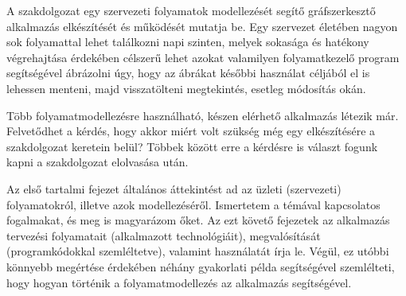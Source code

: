 
A szakdolgozat egy szervezeti folyamatok modellezését segítő gráfszerkesztő alkalmazás elkészítését és működését mutatja be. Egy szervezet életében nagyon sok folyamattal lehet találkozni napi szinten, melyek sokasága és hatékony végrehajtása érdekében célszerű lehet azokat valamilyen folyamatkezelő program segítségével ábrázolni úgy, hogy az ábrákat későbbi használat céljából el is lehessen menteni, majd visszatölteni megtekintés, esetleg módosítás okán.

Több folyamatmodellezésre használható, készen elérhető alkalmazás létezik már. Felvetődhet a kérdés, hogy akkor miért volt szükség még egy elkészítésére a szakdolgozat keretein belül? Többek között erre a kérdésre is választ fogunk kapni a szakdolgozat elolvasása után.

Az első tartalmi fejezet általános áttekintést ad az üzleti (szervezeti) folyamatokról, illetve azok modellezéséről. Ismertetem a témával kapcsolatos fogalmakat, és meg is magyarázom őket. Az ezt követő fejezetek az alkalmazás tervezési folyamatait (alkalmazott technológiáit), megvalósítását (programkódokkal szemléltetve), valamint használatát írja le. Végül, ez utóbbi könnyebb megértése érdekében néhány gyakorlati példa segítségével szemlélteti, hogy hogyan történik a folyamatmodellezés az alkalmazás segítségével.